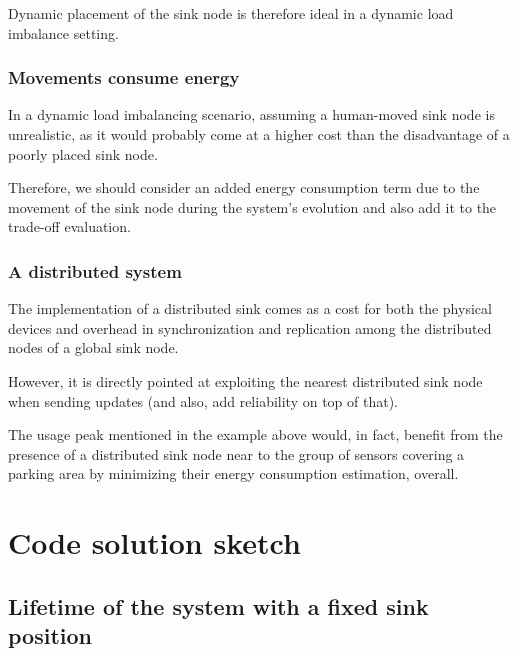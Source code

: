 \documentclass[a4paper,11pt]{article} %
\begin{document}
    Dynamic placement of the sink node is therefore ideal in a dynamic load imbalance setting.

    \subsubsection{Movements consume energy}

    In a dynamic load imbalancing scenario, assuming a human-moved sink node is unrealistic, as it would probably come at a higher cost than the disadvantage of a poorly placed sink node.

    Therefore, we should consider an added energy consumption term due to the movement of the sink node during the system's evolution and also add it to the trade-off evaluation.

    \subsubsection{A distributed system}

    The implementation of a distributed sink comes as a cost for both the physical devices and overhead in synchronization and replication among the distributed nodes of a global sink node.

    However, it is directly pointed at exploiting the nearest distributed sink node when sending updates (and also, add reliability on top of that).

    The usage peak mentioned in the example above would, in fact, benefit from the presence of a distributed sink node near to the group of sensors covering a parking area by minimizing their energy consumption estimation, overall.


    \section{Code solution sketch}\label{sec:code-solution-sketch}

    \subsection{Lifetime of the system with a fixed sink position}\label{subsec:lifetime-of-the-system-with-a-fixed-sink-position}
\end{document}
